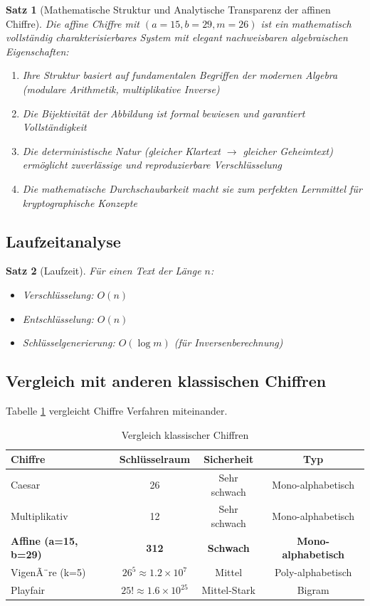 ﻿\documentclass[12pt,a4paper]{article}
\newtheorem{theorem}{Satz}
\begin{document}
	\begin{theorem}[Mathematische Struktur und Analytische Transparenz der affinen Chiffre]
		Die affine Chiffre mit $(a=15, b=29, m=26)$ ist ein mathematisch vollständig charakterisierbares System mit elegant nachweisbaren algebraischen Eigenschaften:
		\begin{enumerate}
			\item Ihre Struktur basiert auf fundamentalen Begriffen der modernen Algebra (modulare Arithmetik, multiplikative Inverse)
			\item Die Bijektivität der Abbildung ist formal bewiesen und garantiert Vollständigkeit
			\item Die deterministische Natur (gleicher Klartext $\to$ gleicher Geheimtext) ermöglicht zuverlässige und reproduzierbare Verschlüsselung
			\item Die mathematische Durchschaubarkeit macht sie zum perfekten Lernmittel für kryptographische Konzepte
		\end{enumerate}
	\end{theorem}
	
	\subsection{Laufzeitanalyse}
	
	\begin{theorem}[Laufzeit]
		Für einen Text der Länge $n$:
		\begin{itemize}
			\item Verschlüsselung: $O(n)$
			\item Entschlüsselung: $O(n)$
			\item Schlüsselgenerierung: $O(\log m)$ (für Inversenberechnung)
		\end{itemize}
	\end{theorem}
	
	\subsection{Vergleich mit anderen klassischen Chiffren}
	Tabelle \ref{tab:cpm-chiffre} vergleicht Chiffre Verfahren miteinander.
	\begin{table}
		\centering
		\caption{Vergleich klassischer Chiffren}
		\begin{tabular}{|l|c|c|c|}
			\hline
			\textbf{Chiffre} & \textbf{Schlüsselraum} & \textbf{Sicherheit} & \textbf{Typ} \\
			\hline\hline
			Caesar & 26 & Sehr schwach & Mono-alphabetisch \\
			\hline
			Multiplikativ & 12 & Sehr schwach & Mono-alphabetisch \\
			\hline
			\textbf{Affine (a=15, b=29)} & \textbf{312} & \textbf{Schwach} & \textbf{Mono-alphabetisch} \\
			\hline
			VigenÃ¨re (k=5) & $26^5 \approx 1.2 \times 10^7$ & Mittel & Poly-alphabetisch \\
			\hline
			Playfair & $25! \approx 1.6 \times 10^{25}$ & Mittel-Stark & Bigram \\
			\hline
		\end{tabular}
		\label{tab:cpm-chiffre}
	\end{table}
	
\end{document}
